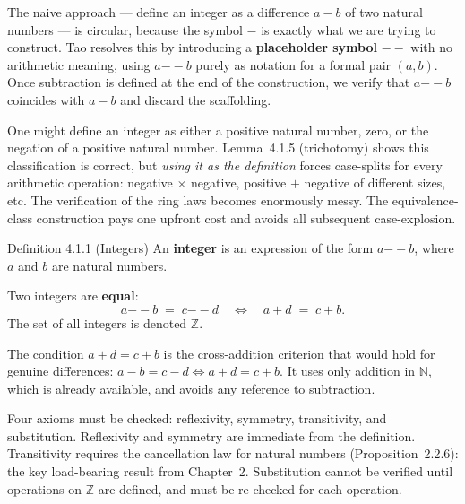 \begin{remark*}
The naive approach — define an integer as a difference $a - b$ of two
natural numbers — is circular, because the symbol $-$ is exactly what we
are trying to construct.
Tao resolves this by introducing a \textbf{placeholder symbol} $--$
with no arithmetic meaning, using $a {-\!\!-} b$ purely as notation for a
formal pair $(a, b)$.
Once subtraction is defined at the end of the construction, we verify that
$a {-\!\!-} b$ coincides with $a - b$ and discard the scaffolding.
\end{remark*}

\begin{remark*}
One might define an integer as either a positive natural number, zero,
or the negation of a positive natural number.
Lemma~4.1.5 (trichotomy) shows this classification is correct, but
\emph{using it as the definition} forces case-splits for every arithmetic
operation: negative $\times$ negative, positive $+$ negative of different
sizes, etc. The verification of the ring laws becomes enormously messy.
The equivalence-class construction pays one upfront cost and avoids
all subsequent case-explosion.
\end{remark*}

\begin{propositionbox}{Definition 4.1.1 (Integers)}
An \textbf{integer} is an expression of the form $a {-\!\!-} b$, where
$a$ and $b$ are natural numbers.

Two integers are \textbf{equal}:
\[
a {-\!\!-} b \;=\; c {-\!\!-} d
\quad\iff\quad
a + d \;=\; c + b.
\]
The set of all integers is denoted $\mathbb{Z}$.
\end{propositionbox}

\begin{remark*}
The condition $a + d = c + b$ is the cross-addition criterion that would
hold for genuine differences: $a - b = c - d \iff a + d = c + b$.
It uses only addition in $\mathbb{N}$, which is already available,
and avoids any reference to subtraction.
\end{remark*}

\begin{remark*}
Four axioms must be checked: reflexivity, symmetry, transitivity,
and substitution.
Reflexivity and symmetry are immediate from the definition.
Transitivity requires the cancellation law for natural numbers
(Proposition~2.2.6): the key load-bearing result from Chapter~2.
Substitution cannot be verified until operations on $\mathbb{Z}$ are
defined, and must be re-checked for each operation.
\end{remark*}


